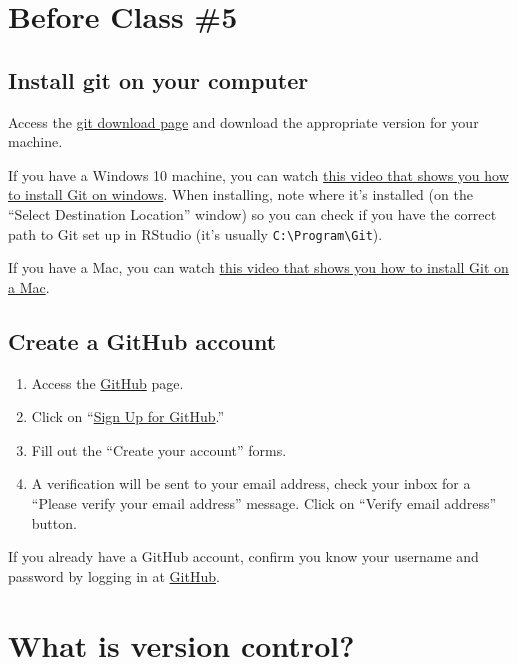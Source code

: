 \documentclass[
]{book}
\begin{document}
\hypertarget{before-class-5}{%
\section{Before Class \#5}\label{before-class-5}}

\hypertarget{install-git-on-your-computer}{%
\subsection{Install git on your computer}\label{install-git-on-your-computer}}

Access the \href{https://git-scm.com/download}{git download page} and download the appropriate version for your machine.

If you have a Windows 10 machine, you can watch \href{https://www.youtube.com/watch?v=nbFwejIsHlY}{this video that shows you how to install Git on windows}. When installing, note where it's installed (on the ``Select Destination Location'' window) so you can check if you have the correct path to Git set up in RStudio (it's usually \texttt{C:\textbackslash{}Program\textbackslash{}Git}).

If you have a Mac, you can watch \href{https://www.youtube.com/watch?v=PSULlxUk744}{this video that shows you how to install Git on a Mac}.

\hypertarget{create-a-github-account}{%
\subsection{Create a GitHub account}\label{create-a-github-account}}

\begin{enumerate}
\def\labelenumi{\arabic{enumi}.}
\item
  Access the \href{https://github.com/}{GitHub} page.
\item
  Click on ``\href{https://github.com/join}{Sign Up for GitHub}.''
\item
  Fill out the ``Create your account'' forms.
\item
  A verification will be sent to your email address, check your inbox for a ``Please verify your email address'' message. Click on ``Verify email address'' button.
\end{enumerate}

If you already have a GitHub account, confirm you know your username and password by logging in at \href{https://github.com/}{GitHub}.

\hypertarget{what-is-version-control}{%
\section{What is version control?}\label{what-is-version-control}}
\end{document}
